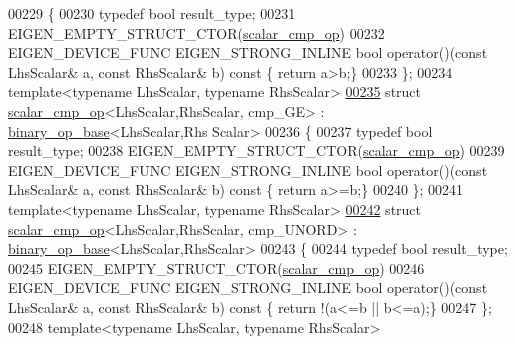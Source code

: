\begin{DoxyCode}
00229 \{
00230   \textcolor{keyword}{typedef} \textcolor{keywordtype}{bool} result\_type;
00231   EIGEN\_EMPTY\_STRUCT\_CTOR(\hyperlink{struct_eigen_1_1internal_1_1scalar__cmp__op}{scalar\_cmp\_op})
00232   EIGEN\_DEVICE\_FUNC EIGEN\_STRONG\_INLINE \textcolor{keywordtype}{bool} operator()(\textcolor{keyword}{const} LhsScalar& a, \textcolor{keyword}{const} RhsScalar& b)\textcolor{keyword}{ const }\{\textcolor{keywordflow}{
      return} a>b;\}
00233 \};
00234 \textcolor{keyword}{template}<\textcolor{keyword}{typename} LhsScalar, \textcolor{keyword}{typename} RhsScalar>
\hyperlink{struct_eigen_1_1internal_1_1scalar__cmp__op_3_01_lhs_scalar_00_01_rhs_scalar_00_01cmp___g_e_01_4}{00235} \textcolor{keyword}{struct }\hyperlink{struct_eigen_1_1internal_1_1scalar__cmp__op}{scalar\_cmp\_op}<LhsScalar,RhsScalar, cmp\_GE> : \hyperlink{struct_eigen_1_1internal_1_1binary__op__base}{binary\_op\_base}<LhsScalar,Rhs
      Scalar>
00236 \{
00237   \textcolor{keyword}{typedef} \textcolor{keywordtype}{bool} result\_type;
00238   EIGEN\_EMPTY\_STRUCT\_CTOR(\hyperlink{struct_eigen_1_1internal_1_1scalar__cmp__op}{scalar\_cmp\_op})
00239   EIGEN\_DEVICE\_FUNC EIGEN\_STRONG\_INLINE \textcolor{keywordtype}{bool} operator()(\textcolor{keyword}{const} LhsScalar& a, \textcolor{keyword}{const} RhsScalar& b)\textcolor{keyword}{ const }\{\textcolor{keywordflow}{
      return} a>=b;\}
00240 \};
00241 \textcolor{keyword}{template}<\textcolor{keyword}{typename} LhsScalar, \textcolor{keyword}{typename} RhsScalar>
\hyperlink{struct_eigen_1_1internal_1_1scalar__cmp__op_3_01_lhs_scalar_00_01_rhs_scalar_00_01cmp___u_n_o_r_d_01_4}{00242} \textcolor{keyword}{struct }\hyperlink{struct_eigen_1_1internal_1_1scalar__cmp__op}{scalar\_cmp\_op}<LhsScalar,RhsScalar, cmp\_UNORD> : 
      \hyperlink{struct_eigen_1_1internal_1_1binary__op__base}{binary\_op\_base}<LhsScalar,RhsScalar>
00243 \{
00244   \textcolor{keyword}{typedef} \textcolor{keywordtype}{bool} result\_type;
00245   EIGEN\_EMPTY\_STRUCT\_CTOR(\hyperlink{struct_eigen_1_1internal_1_1scalar__cmp__op}{scalar\_cmp\_op})
00246   EIGEN\_DEVICE\_FUNC EIGEN\_STRONG\_INLINE \textcolor{keywordtype}{bool} operator()(\textcolor{keyword}{const} LhsScalar& a, \textcolor{keyword}{const} RhsScalar& b)\textcolor{keyword}{ const }\{\textcolor{keywordflow}{
      return} !(a<=b || b<=a);\}
00247 \};
00248 \textcolor{keyword}{template}<\textcolor{keyword}{typename} LhsScalar, \textcolor{keyword}{typename} RhsScalar>

\end{DoxyCode}
